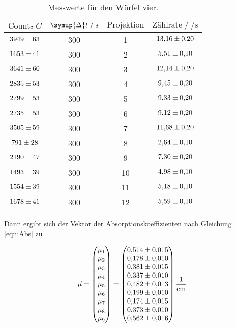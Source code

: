 \begin{table}[H]
  \centering
  \caption{Messwerte für den Würfel vier.}
  \label{tab:mess6}
  \begin{tabular}{c c c c}
  \toprule
  $\text{Counts} \; C$ & $\symup{\Delta} t \;/\; \si{\second}$ & $\text{Projektion}$ & $\text{Zählrate} \;/\; \si{\per\second}$\\
  \midrule
      $\num{3949+-63}$ & 300 & 1 & $\num{13.16+-0.2}$\\
      $\num{1653+-41}$ & 300 & 2 & $\num{5.51+-0.1}$\\
      $\num{3641+-60}$ & 300 & 3 & $\num{12.14+-0.2}$\\
      $\num{2835+-53}$ & 300 & 4 & $\num{9.45+-0.2}$\\
      $\num{2799+-53}$ & 300 & 5 & $\num{9.33+-0.2}$\\
      $\num{2735+-53}$ & 300 & 6 & $\num{9.12+-0.2}$\\
      $\num{3505+-59}$ & 300 & 7 & $\num{11.68+-0.2}$\\
      $\num{791+-28}$ & 300 & 8 & $\num{2.64+-0.1}$\\
      $\num{2190+-47}$ & 300 & 9 & $\num{7.30+-0.2}$\\
      $\num{1493+-39}$ & 300 & 10 & $\num{4.98+-0.1}$\\
      $\num{1554+-39}$ & 300 & 11 & $\num{5.18+-0.1}$\\
      $\num{1678+-41}$ & 300 & 12 & $\num{5.59+-0.1}$\\
  \bottomrule
  \end{tabular}
\end{table}

Dann ergibt sich der Vektor der Absorptionskoeffizienten nach Gleichung \eqref{eqn:Abs} zu 

\begin{equation*}
  \vec{\mu} = 
    \begin{pmatrix}
      \mu_1\\
      \mu_2\\
      \mu_3\\
      \mu_4\\
      \mu_5\\
      \mu_6\\
      \mu_7\\
      \mu_8\\
      \mu_9\\
    \end{pmatrix}
    = 
    \begin{pmatrix}
      \num{0.514+-0.015}\\
      \num{0.178+-0.010}\\
      \num{0.381+-0.015}\\
      \num{0.337+-0.010}\\
      \num{0.482+-0.013}\\
      \num{0.199+-0.010}\\
      \num{0.174+-0.015}\\
      \num{0.373+-0.010}\\
      \num{0.562+-0.016}\\
    \end{pmatrix}
    \si{\per\centi\metre}
\end{equation*}

